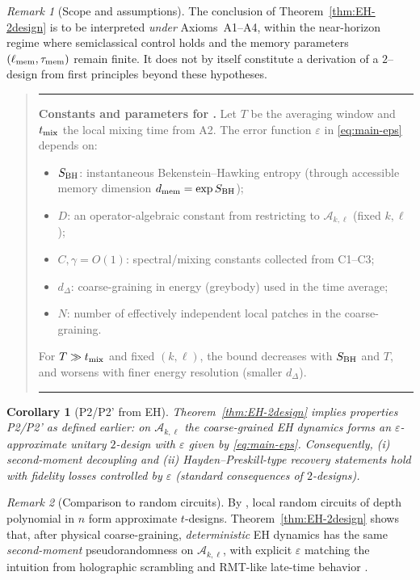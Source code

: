 \documentclass[a4paper,11pt]{article}
\newenvironment{infobox}{%
  \par\smallskip\begin{quote}\noindent\hrule\smallskip
}{%
  \smallskip\hrule\end{quote}\smallskip
}
\newenvironment{boxedresult}[1]{\begin{infobox}\noindent\textbf{#1.}}{\end{infobox}}
\let\mathscr\mathcal
\theoremstyle{plain}
\newtheorem{corollary}{Corollary}
\theoremstyle{definition}
\theoremstyle{remark}
\newtheorem{remark}{Remark}
\begin{document}
\begin{remark}[Scope and assumptions]
The conclusion of Theorem~\ref{thm:EH-2design} is to be interpreted \emph{under} Axioms~A1--A4, within the near-horizon regime where semiclassical control holds and the memory parameters $(\ell_{\rm mem},\tau_{\rm mem})$ remain finite. It does not by itself constitute a derivation of a $2$--design from first principles beyond these hypotheses.
\end{remark}

\begin{boxedresult}{Constants and parameters for \Cref{thm:EH-2design}}\label{box:constants-eps}
Let $T$ be the averaging window and $t_{\rm mix}$ the local mixing time from A2. The error function $\varepsilon$ in \eqref{eq:main-eps} depends on:
\begin{itemize}[leftmargin=*,itemsep=0.2em]
  \item $S_{\rm BH}$: instantaneous Bekenstein--Hawking entropy (through accessible memory dimension $d_{\rm mem}=\exp S_{\rm BH}$);
  \item $D$: an operator-algebraic constant from restricting to $\mathscr{A}_{k,\ell}$ (fixed $k,\ell$);
  \item $C,\gamma = O(1)$: spectral/mixing constants collected from C1--C3;
  \item $d_\Delta$: coarse-graining in energy (greybody) used in the time average;
  \item $N$: number of effectively independent local patches in the coarse-graining.
\end{itemize}
For $T\gg t_{\rm mix}$ and fixed $(k,\ell)$, the bound decreases with $S_{\rm BH}$ and $T$, and worsens with finer energy resolution (smaller $d_\Delta$).
\end{boxedresult}

\begin{corollary}[P2/P2' from EH]\label{cor:P2P2prime}
Theorem~\ref{thm:EH-2design} implies properties P2/P2' as defined earlier: on $\mathscr{A}_{k,\ell}$ the coarse-grained EH dynamics forms an $\varepsilon$-approximate unitary $2$-design with $\varepsilon$ given by \eqref{eq:main-eps}.  Consequently, (i) second-moment decoupling and (ii) Hayden--Preskill-type recovery statements hold with fidelity losses controlled by $\varepsilon$ (standard consequences of $2$-designs).
\end{corollary}

\begin{remark}[Comparison to random circuits]
By \cite{BrandaoHarrowHorodecki2016}, local random circuits of depth polynomial in $n$ form approximate $t$-designs.  Theorem~\ref{thm:EH-2design} shows that, after physical coarse-graining, {\em deterministic} EH dynamics has the same {\em second-moment} pseudorandomness on $\mathscr{A}_{k,\ell}$, with explicit $\varepsilon$ matching the intuition from holographic scrambling and RMT-like late-time behavior \cite{SaadShenkerStanford2019,CotlerEtAl2017}.
\end{remark}
\end{document}
